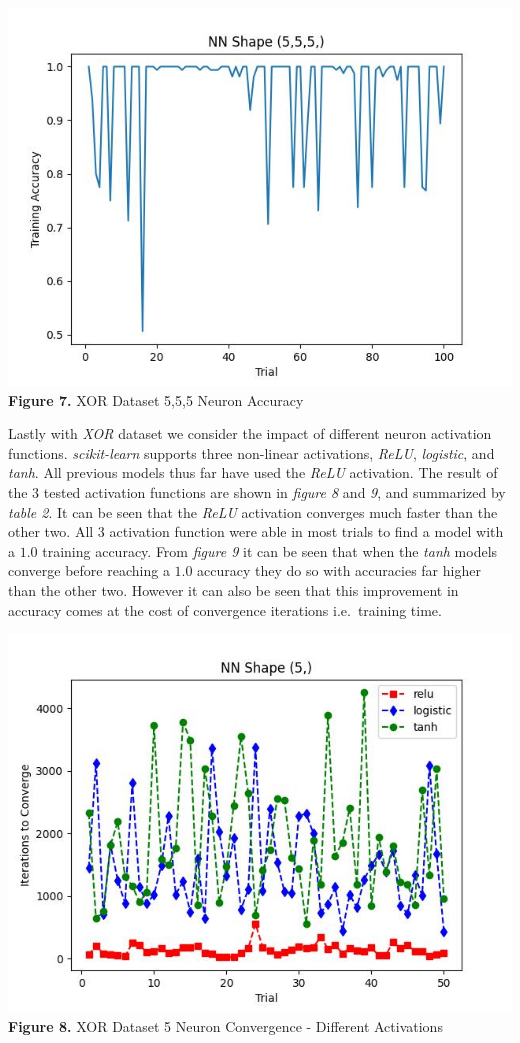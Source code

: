\documentclass[11pt]{article}
\begin{document}
\includegraphics{figures/xor_555_acc.jpg}\\
\textbf{Figure 7.} XOR Dataset 5,5,5 Neuron Accuracy

Lastly with \emph{XOR} dataset we consider the impact of different
neuron activation functions. \emph{scikit-learn} supports three
non-linear activations, \emph{ReLU}, \emph{logistic}, and \emph{tanh}.
All previous models thus far have used the \emph{ReLU} activation. The
result of the 3 tested activation functions are shown in \emph{figure 8}
and \emph{9}, and summarized by \emph{table 2}. It can be seen that the
\emph{ReLU} activation converges much faster than the other two. All 3
activation function were able in most trials to find a model with a
\(1.0\) training accuracy. From \emph{figure 9} it can be seen that when
the \emph{tanh} models converge before reaching a \(1.0\) accuracy they
do so with accuracies far higher than the other two. However it can also
be seen that this improvement in accuracy comes at the cost of
convergence iterations i.e.~training time.

\includegraphics{figures/xor_5_activation_conv.jpg}\\
\textbf{Figure 8.} XOR Dataset 5 Neuron Convergence - Different
Activations
\end{document}
